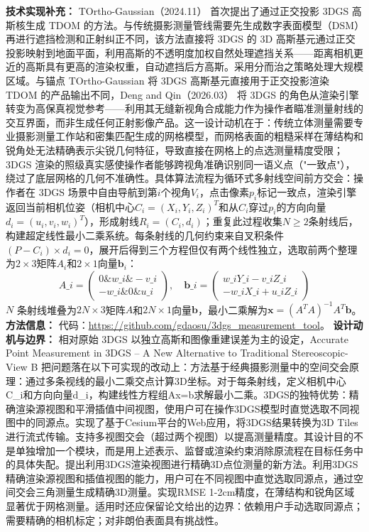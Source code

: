 \textbf{技术实现补充：} TOrtho-Gaussian（2024.11） 首次提出了通过正交投影 3DGS 高斯核生成 TDOM 的方法。与传统摄影测量管线需要先生成数字表面模型（DSM）再进行遮挡检测和正射纠正不同，该方法直接将 3DGS 的 3D 高斯基元通过正交投影映射到地面平面，利用高斯的不透明度加权自然处理遮挡关系——距离相机更近的高斯具有更高的渲染权重，自动遮挡后方高斯。采用分而治之策略处理大规模区域。与锚点 TOrtho-Gaussian 将 3DGS 高斯基元直接用于正交投影渲染 TDOM 的产品输出不同，Deng and Qin（2026.03） 将 3DGS 的角色从渲染引擎转变为高保真视觉参考——利用其无缝新视角合成能力作为操作者瞄准测量射线的交互界面，而非生成任何正射影像产品。这一设计动机在于：传统立体测量需要专业摄影测量工作站和密集匹配生成的网格模型，而网格表面的粗糙采样在薄结构和锐角处无法精确表示尖锐几何特征，导致直接在网格上的点选测量精度受限；3DGS 渲染的照级真实感使操作者能够跨视角准确识别同一语义点（"一致点"），绕过了底层网格的几何不准确性。具体算法流程为循环式多射线空间前方交会：操作者在 3DGS 场景中自由导航到第$i$个视角$V_i$，点击像素$p_i$标记一致点，渲染引擎返回当前相机位姿（相机中心$C_i = (X_i, Y_i, Z_i)^T$和从$C_i$穿过$p_i$的方向向量$d_i = (u_i, v_i, w_i)^T$），形成射线$R_i = (C_i, d_i)$；重复此过程收集$N \geq 2$条射线后，构建超定线性最小二乘系统。每条射线的几何约束来自叉积条件$(P - C_i) \times d_i = 0$，展开后得到三个方程但仅有两个线性独立，选取前两个整理为$2 \times 3$矩阵$A_i$和$2 \times 1$向量$\mathbf{b}_i$： \begin{equation*} A\_i = \begin{pmatrix} 0 \& w\_i \& -v\_i \\ -w\_i \& 0 \& u\_i \end{pmatrix}, \quad \mathbf{b}\_i = \begin{pmatrix} w\_i Y\_i - v\_i Z\_i \\ -w\_i X\_i + u\_i Z\_i \end{pmatrix} \end{equation*} $N$ 条射线堆叠为$2N \times 3$矩阵$A$和$2N \times 1$向量$\mathbf{b}$，最小二乘解为$\mathbf{x} = (A^TA)^{-1}A^T\mathbf{b}$。
\textbf{方法信息：} 代码：\url{https://github.com/gdaosu/3dgs_measurement_tool}。
\textbf{设计动机与边界：} 相对原始 3DGS 以独立高斯和图像重建误差为主的设定，Accurate Point Measurement in 3DGS -- A New Alternative to Traditional Stereoscopic-View B 把问题落在以下可实现的改动上：方法基于经典摄影测量中的空间交会原理：通过多条视线的最小二乘交点计算3D坐标。对于每条射线，定义相机中心C\_i和方向向量d\_i，构建线性方程组Ax=b求解最小二乘。3DGS的独特优势：精确渲染源视图和平滑插值中间视图，使用户可在操作3DGS模型时直觉选取不同视图中的同源点。实现了基于Cesium平台的Web应用，将3DGS结果转换为3D Tiles进行流式传输。支持多视图交会（超过两个视图）以提高测量精度。其设计目的不是单独增加一个模块，而是用上述表示、监督或渲染约束消除原流程在目标任务中的具体失配。提出利用3DGS渲染视图进行精确3D点位测量的新方法。利用3DGS精确渲染源视图和插值视图的能力，用户可在不同视图中直觉选取同源点，通过空间交会三角测量生成精确3D测量。实现RMSE 1-2cm精度，在薄结构和锐角区域显著优于网格测量。适用时还应保留论文给出的边界：依赖用户手动选取同源点；需要精确的相机标定；对非朗伯表面具有挑战性。

